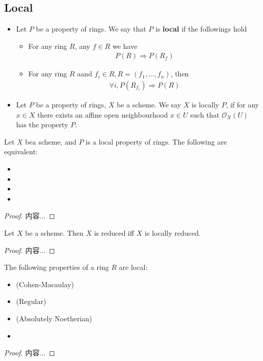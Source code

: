 \documentclass[Total.tex]{subfiles}
\begin{document}
		\subsection{Local}
		\begin{Def}
			\begin{itemize}
				\item Let $P$ be a property of rings. We say that $P$ is \textbf{local} if the followings hold
				\begin{itemize}
					\item For any ring $R$, any $f\in R$ we have
					\begin{gather*}
						P(R)\Rightarrow P(R_f)
					\end{gather*}
					\item For any ring $R$ aand $f_i\in R,R=(f_1,\dots,f_n)$, then 
					\begin{gather*}
						\forall i,P(R_{f_i})\Rightarrow P(R)
					\end{gather*}
				\end{itemize}
				\item Let $P$ be a property of rings, $X$ be a scheme. We say $X$ is locally $P$, if for any $x\in X$ there exists an affine open neighbourhood $x\in U$ such that $\mathcal{O}_X(U)$ has the property $P$.
			\end{itemize}
		\end{Def}
		\begin{lemma}
			Let $X$ bea scheme, and $P$ is a local property of rings. The following are equivalent:
			\begin{itemize}
				\item 
				\item 
				\item 
				\item 
			\end{itemize}
		\end{lemma}
		\begin{proof}
			内容...
		\end{proof}
		
		\begin{lemma}
			Let $X$ be a scheme. Then $X$ is reduced iff $X$ is locally reduced.
		\end{lemma}
		\begin{proof}
			内容...
		\end{proof}
		
		\begin{lemma}
			The following properties of a ring $R$ are local:
			\begin{itemize}
				\item (Cohen-Macaulay)
				\item (Regular)
				\item (Absolutely Noetherian)
				\item 
			\end{itemize}
		\end{lemma}
		\begin{proof}
			内容...
		\end{proof}
\end{document}
